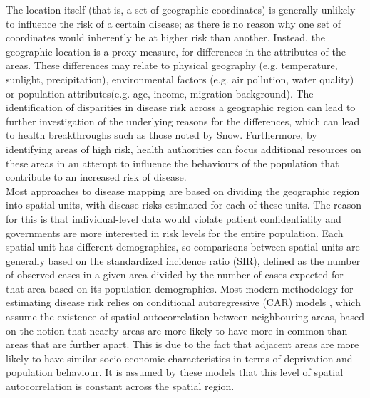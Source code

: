 The location itself (that is, a set of geographic coordinates) is generally unlikely to influence the risk of a certain disease; as there is no reason why one set of coordinates would inherently be at higher risk than another. Instead, the geographic location is a proxy measure, for differences in the attributes of the areas. These differences may relate to physical geography (e.g. temperature, sunlight, precipitation), environmental factors (e.g. air pollution, water quality) or population attributes(e.g. age, income, migration background). The identification of disparities in disease risk across a geographic region can lead to further investigation of the underlying reasons for the differences, which can lead to health breakthroughs such as those noted by Snow. Furthermore, by identifying areas of high risk, health authorities can focus additional resources on these areas in an attempt to influence the behaviours of the population that contribute to an increased risk of disease. \\
Most approaches to disease mapping are based on dividing the geographic region into spatial units, with disease risks estimated for each of these units. The reason for this is that individual-level data would violate patient confidentiality and governments are more interested in risk levels for the entire population. Each spatial unit has different demographics, so comparisons between spatial units are generally based on the standardized incidence ratio (SIR), defined as the number of observed cases in a given area divided by the number of cases expected for that area based on its population demographics.  Most modern methodology for estimating disease risk relies on conditional autoregressive (CAR) models \autocite[][]{besag1991bayesian}, which assume the existence of spatial autocorrelation between neighbouring areas, based on the notion that nearby areas are more likely to have more in common than areas that are further apart. This is due to the fact that adjacent areas are more likely to have similar socio-economic characteristics in terms of deprivation and population behaviour. It is assumed by these models that this level of spatial autocorrelation is constant across the spatial region.
\clearpage

